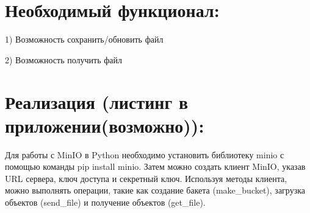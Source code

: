 \documentclass[a4paper,12pt]{article}
\begin{document}
\section{Необходимый функционал:}
\begin{description}
    \item 1) Возможность сохранить/обновить файл
    \item 2) Возможность получить файл
\end{description}
\section{Реализация (листинг в приложении(возможно)):}
   Для работы с MinIO в Python необходимо установить библиотеку minio с помощью команды pip install minio. Затем можно создать клиент MinIO, указав URL сервера, ключ доступа и секретный ключ. Используя методы клиента, можно выполнять операции, такие как создание бакета (make\_bucket), загрузка объектов (send\_file) и получение объектов (get\_file).
\end{document}
